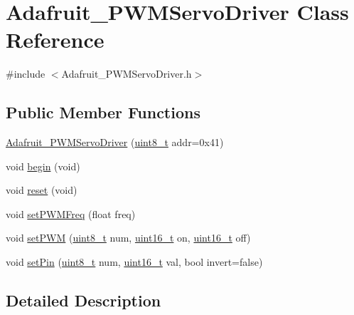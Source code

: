\hypertarget{classAdafruit__PWMServoDriver}{\section{Adafruit\+\_\+\+P\+W\+M\+Servo\+Driver Class Reference}
\label{classAdafruit__PWMServoDriver}
}


{\ttfamily \#include $<$Adafruit\+\_\+\+P\+W\+M\+Servo\+Driver.\+h$>$}

\subsection*{Public Member Functions}
\begin{DoxyCompactItemize}
\item 
\hyperlink{classAdafruit__PWMServoDriver_a6a949db60836febbc61adef4cc5429ed}{Adafruit\+\_\+\+P\+W\+M\+Servo\+Driver} (\hyperlink{NavigationControl_8h_ab077fa1127453be2bd9d4c3c8a768fa7}{uint8\+\_\+t} addr=0x41)
\item 
void \hyperlink{classAdafruit__PWMServoDriver_aef401eaad3c34222ac916eb7bd936bc2}{begin} (void)
\item 
void \hyperlink{classAdafruit__PWMServoDriver_ac976f52233a75a4bd0eb6f2ce9b82b7f}{reset} (void)
\item 
void \hyperlink{classAdafruit__PWMServoDriver_a0ef6f1e3c81aebbd1d1da1bb12f3ed5c}{set\+P\+W\+M\+Freq} (float freq)
\item 
void \hyperlink{classAdafruit__PWMServoDriver_a724a7fc39c6fba34478ecc0eea038bd3}{set\+P\+W\+M} (\hyperlink{NavigationControl_8h_ab077fa1127453be2bd9d4c3c8a768fa7}{uint8\+\_\+t} num, \hyperlink{Adafruit__PWMServoDriver_8h_a395b3b2bf5cb4674ab41b6bda68c15bb}{uint16\+\_\+t} on, \hyperlink{Adafruit__PWMServoDriver_8h_a395b3b2bf5cb4674ab41b6bda68c15bb}{uint16\+\_\+t} off)
\item 
void \hyperlink{classAdafruit__PWMServoDriver_a1246cd50849fe0f068cc5d474e06ae96}{set\+Pin} (\hyperlink{NavigationControl_8h_ab077fa1127453be2bd9d4c3c8a768fa7}{uint8\+\_\+t} num, \hyperlink{Adafruit__PWMServoDriver_8h_a395b3b2bf5cb4674ab41b6bda68c15bb}{uint16\+\_\+t} val, bool invert=false)
\end{DoxyCompactItemize}


\subsection{Detailed Description}


